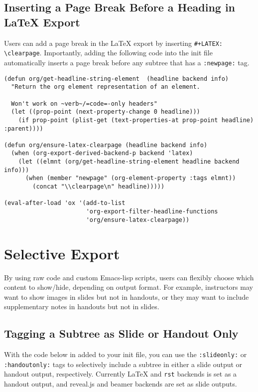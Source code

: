 \documentclass[10pt,article]{article}
\begin{document}
\subsection{Inserting a Page Break Before a Heading in \LaTeX{} Export}
\label{sec:org5e74bd9}
Users can add a page break in the \LaTeX{} export by inserting
\texttt{\#+LATEX: \textbackslash{}clearpage}. Importantly, adding the following code into the init file
automatically inserts a page break before any subtree that has a \texttt{:newpage:}
tag.

{\small
\begin{verbatim}
(defun org/get-headline-string-element  (headline backend info)
  "Return the org element representation of an element.

  Won't work on ~verb~/=code=-only headers"
  (let ((prop-point (next-property-change 0 headline)))
    (if prop-point (plist-get (text-properties-at prop-point headline) :parent))))

(defun org/ensure-latex-clearpage (headline backend info)
  (when (org-export-derived-backend-p backend 'latex)
    (let ((elmnt (org/get-headline-string-element headline backend info)))
      (when (member "newpage" (org-element-property :tags elmnt))
        (concat "\\clearpage\n" headline)))))

(eval-after-load 'ox '(add-to-list
                       'org-export-filter-headline-functions
                       'org/ensure-latex-clearpage))
\end{verbatim}
}
\section{Selective Export}
\label{sec:orga8e28b4}
By using raw code and custom Emacs-lisp scripts, users can flexibly choose
which content to show/hide, depending on output format. For example,
instructors may want to show images in slides but not in handouts, or they may
want to include supplementary notes in handouts but not in slides.
\subsection{Tagging a Subtree as Slide or Handout Only}
\label{sec:orgffd1dff}
With the code below in added to your init file, you can use the \texttt{:slideonly:}
or \texttt{:handoutonly:} tags to selectively include a subtree in either a slide
output or handout output, respectively. Currently \LaTeX{} and \texttt{rst} backends is
set as a handout output, and reveal.js and beamer backends are set as slide
outputs.
\end{document}
